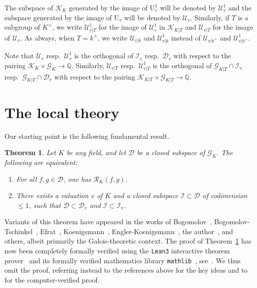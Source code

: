 \documentclass[12pt]{amsart}
\newcommand{\Qbb}{\mathbb{Q}}
\newcommand{\Urm}{\mathrm{U}}
\newcommand{\Gcal}{\mathcal{G}}
\newcommand{\Rcal}{\mathcal{R}}
\newcommand{\Dcal}{\mathcal{D}}
\newcommand{\Ical}{\mathcal{I}}
\newcommand{\Ucal}{\mathcal{U}}
\newcommand{\Kcal}{\mathcal{K}}
\newtheorem{theorem}{Theorem}[section]
\theoremstyle{definition}
\begin{document}
The subspace of $\Kcal_{K}$ generated by the image of $\Urm_{v}^{1}$ will be denoted by $\Ucal_{v}^{1}$ and the subspace generated by the image of $\Urm_{v}$ will be denoted by $\Ucal_{v}$.
Similarly, if $T$ is a subgroup of $K^{\times}$, we write $\Ucal_{v|T}^{1}$ for the image of $\Ucal_{v}^{1}$ in $\Kcal_{K|T}$ and $\Ucal_{v|T}$ for the image of $\Ucal_{v}$.
As always, when $T = k^{\times}$, we write $\Ucal_{v|k}$ and $\Ucal_{v|k}^{1}$ instead of $\Ucal_{v|k^{\times}}$ and $\Ucal_{v|k^{\times}}^{1}$.

Note that $\Ucal_{v}$ resp.~$\Ucal_{v}^{1}$ is the orthogonal of $\Ical_{v}$ resp.~$\Dcal_{v}$ with respect to the pairing $\Kcal_{K} \times \Gcal_{K} \to \Qbb$.
Similarly, $\Ucal_{v|T}$ resp.~$\Ucal_{v|T}^{1}$ is the orthogonal of $\Gcal_{K|T} \cap \Ical_{v}$ resp.~$\Gcal_{K|T} \cap \Dcal_{v}$ with respect to the pairing $\Kcal_{K|T} \times \Gcal_{K|T} \to \Qbb$.

\section{The local theory}

Our starting point is the following fundamental result.
\begin{theorem}\label{theorem:main_acl}
  Let $K$ be any field, and let $\Dcal$ be a closed subspace of $\Gcal_{K}$.
  The following are equivalent:
  \begin{enumerate}
    \item For all $f,g \in \Dcal$, one has $\Rcal_{K}(f,g)$.
    \item There exists a valuation $v$ of $K$ and a closed subspace $\Ical \subset \Dcal$ of codimension $\le 1$, such that $\Dcal \subset \Dcal_{v}$ and $\Ical \subset \Ical_{v}$.
  \end{enumerate}
\end{theorem}
Variants of this theorem have appeared in the works of Bogomolov~\cite{zbMATH00124400}, Bogomolov-Tschinkel~\cite{zbMATH02078165}, Efrat~\cite{zbMATH01489500}, Koenigsmann~\cite{zbMATH00785379}, Engler-Koenigsmann~\cite{zbMATH01135369}, the author~\cite{zbMATH06778776,https://doi.org/10.48550/arxiv.1705.01084}, and others, albeit primarily the Galois-theoretic context.
The proof of Theorem~\ref{theorem:main_acl} has now been completely formally verified using the \texttt{Lean3} interactive theorem prover~\cite{10.1007/978-3-319-21401-6_26} and its formally verified mathematics library \texttt{mathlib}~\cite{10.1145/3372885.3373824}, see~\cite{lean-acl-pairs}.
We thus omit the proof, referring instead to the references above for the key ideas and to~\cite{lean-acl-pairs} for the computer-verified proof.
\end{document}
